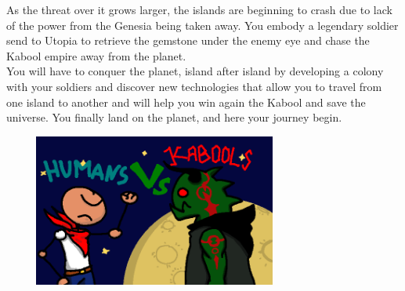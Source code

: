 \documentclass[article]{report} %
\begin{document}
 				As the threat over it grows larger, the islands are beginning to crash due to lack of the power from the Genesia being taken away. You embody a legendary soldier send to Utopia to retrieve the gemstone under the enemy eye and chase the Kabool empire away from the 					planet.\\

				You will have to conquer the planet, island after island by developing a colony with your soldiers and discover new technologies that allow 
				you to travel from one island to another and will help you win again the Kabool and save the universe.
				You finally land on the planet, and here your journey begin. 

\begin{center}				
\includegraphics[width=10cm, height=5cm]{images/Others/fun.png}
\end{center}

				\newpage
\end{document}

